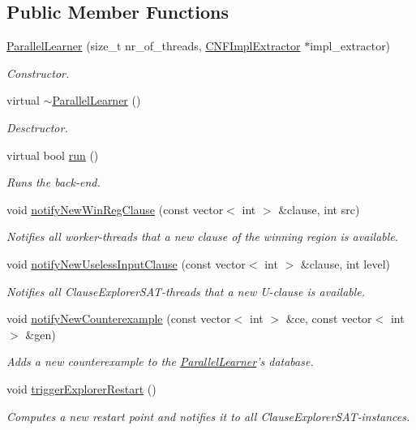 \subsection*{Public Member Functions}
\begin{DoxyCompactItemize}
\item 
\hyperlink{classParallelLearner_af19878077a2dff8ade1de01be095137d}{Parallel\-Learner} (size\-\_\-t nr\-\_\-of\-\_\-threads, \hyperlink{classCNFImplExtractor}{C\-N\-F\-Impl\-Extractor} $\ast$impl\-\_\-extractor)
\begin{DoxyCompactList}\small\item\em Constructor. \end{DoxyCompactList}\item 
virtual \hyperlink{classParallelLearner_a42d85a531cab28bdcb345c37a0b08730}{$\sim$\-Parallel\-Learner} ()
\begin{DoxyCompactList}\small\item\em Desctructor. \end{DoxyCompactList}\item 
virtual bool \hyperlink{classParallelLearner_a93acb74e7c8504d0ef2bd3697441b745}{run} ()
\begin{DoxyCompactList}\small\item\em Runs the back-\/end. \end{DoxyCompactList}\item 
void \hyperlink{classParallelLearner_a10b8346745051c95f05a1bc8356fcf8d}{notify\-New\-Win\-Reg\-Clause} (const vector$<$ int $>$ \&clause, int src)
\begin{DoxyCompactList}\small\item\em Notifies all worker-\/threads that a new clause of the winning region is available. \end{DoxyCompactList}\item 
void \hyperlink{classParallelLearner_a0a8405e4fb7331f3f3df2711fdaebdab}{notify\-New\-Useless\-Input\-Clause} (const vector$<$ int $>$ \&clause, int level)
\begin{DoxyCompactList}\small\item\em Notifies all Clause\-Explorer\-S\-A\-T-\/threads that a new U-\/clause is available. \end{DoxyCompactList}\item 
void \hyperlink{classParallelLearner_a8c59cc455059943f8f9cdb8a60526f5c}{notify\-New\-Counterexample} (const vector$<$ int $>$ \&ce, const vector$<$ int $>$ \&gen)
\begin{DoxyCompactList}\small\item\em Adds a new counterexample to the \hyperlink{classParallelLearner}{Parallel\-Learner}'s database. \end{DoxyCompactList}\item 
void \hyperlink{classParallelLearner_a2b8e4330afb7e99c19d2d7da15c30cc3}{trigger\-Explorer\-Restart} ()
\begin{DoxyCompactList}\small\item\em Computes a new restart point and notifies it to all Clause\-Explorer\-S\-A\-T-\/instances. \end{DoxyCompactList}\end{DoxyCompactItemize}
